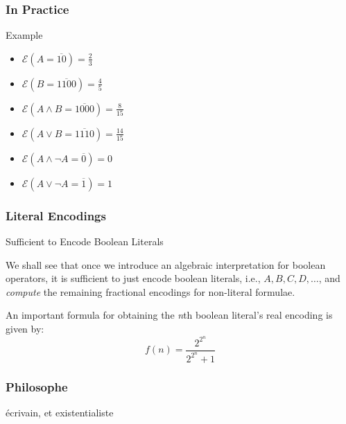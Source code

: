 \documentclass{beamer}
\begin{document}
\begin{frame}
\frametitle{In Practice}
\begin{exampleblock}
{Example} 

\begin{itemize}
\item \(  \mathcal{E}(A  = \overline{10}) = \frac{2}{3} \)
\item \(  \mathcal{E}(B  = \overline{1100}) = \frac{4}{5} \)
\item \(  \mathcal{E}(A \land B  = \overline{1000} ) = \frac{8}{15}\)
\item \(  \mathcal{E}(A \lor B  = \overline{1110} ) = \frac{14}{15}\)
\item \(  \mathcal{E}(A \land \neg A  = \overline{0} ) = 0\)
\item \(  \mathcal{E}(A \lor \neg A  = \overline{1} ) = 1\)
\end{itemize}

\end{exampleblock}
\end{frame}

\begin{frame}
\frametitle{Literal Encodings}
\begin{block}
{Sufficient to Encode Boolean Literals}

We shall see that once we introduce an algebraic interpretation for boolean operators, it is sufficient to just encode boolean literals, i.e., \(A, B, C, D, \ldots\), and \emph{compute} the remaining fractional encodings for non-literal formulae.

An important formula for obtaining the \emph{n}th boolean literal's real encoding is given by:
\[
f(n) = \frac{2^{2^n}}{2^{2^n} + 1}
\]

\end{block}
\end{frame}


\begin{frame}
\frametitle{Philosophe}
\begin{block}
{écrivain, et existentialiste}

\end{block}
\end{frame}
\end{document}
